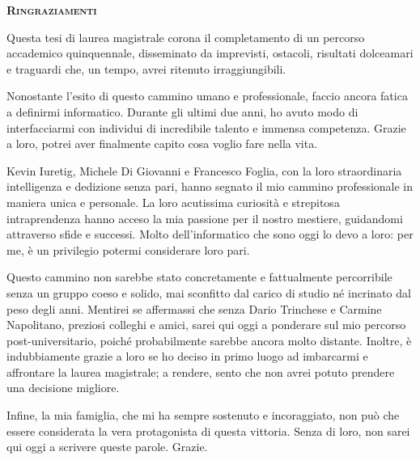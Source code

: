 % 
% 
% 




\newpage
\thispagestyle{empty}

\clearpage
\cleardoublepage
{}

\pagestyle{plain}

{}


\vspace*{\fill}

\begin{center}
    \large \textbf{\textsc{Ringraziamenti}}
\end{center}

Questa tesi di laurea magistrale corona il completamento di un percorso accademico quinquennale, disseminato da imprevisti, ostacoli, risultati dolceamari e traguardi che, un tempo, avrei ritenuto irraggiungibili. 

Nonostante l'esito di questo cammino umano e professionale, faccio ancora fatica a definirmi informatico. Durante gli ultimi due anni, ho avuto modo di interfacciarmi con individui di incredibile talento e immensa competenza. Grazie a loro, potrei aver finalmente capito cosa voglio fare nella vita.

Kevin Iuretig, Michele Di Giovanni e Francesco Foglia, con la loro straordinaria intelligenza e dedizione senza pari, hanno segnato il mio cammino professionale in maniera unica e personale. La loro acutissima curiosità e strepitosa intraprendenza hanno acceso la mia passione per il nostro mestiere, guidandomi attraverso sfide e successi. Molto dell'informatico che sono oggi lo devo a loro: per me, è un privilegio potermi considerare loro pari.

Questo cammino non sarebbe stato concretamente e fattualmente percorribile senza un gruppo coeso e solido, mai sconfitto dal carico di studio né incrinato dal peso degli anni. Mentirei se affermassi che senza Dario Trinchese e Carmine Napolitano, preziosi colleghi e amici, sarei qui oggi a ponderare sul mio percorso post-universitario, poiché probabilmente sarebbe ancora molto distante. Inoltre, è indubbiamente grazie a loro se ho deciso in primo luogo ad imbarcarmi e affrontare la laurea magistrale; a rendere, sento che non avrei potuto prendere una decisione migliore.

Infine, la mia famiglia, che mi ha sempre sostenuto e incoraggiato, non può che essere considerata la vera protagonista di questa vittoria. Senza di loro, non sarei qui oggi a scrivere queste parole. Grazie.

\vspace*{\fill}

